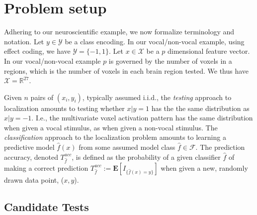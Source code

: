 \documentclass[12pt,a4paper]{article}
\newcommand{\set}[1]{\{ #1 \}} %
\newcommand{\indicator}[1]{I_{\set{#1}}} %
\newcommand{\reals}{\mathbb{R}} %
\newcommand{\features}{x} %
\newcommand{\outcomes}{y} %
\newcommand{\featureS}{\mathcal{X}} %
\newcommand{\outcomeS}{\mathcal{Y}} %
\newcommand{\hyp}{f} %
\newcommand{\hypEstim}{\hat{\hyp}} %
\newcommand{\hypclass}{\mathcal{F}}
\newcommand{\expect}[1]{\mathbf{E}\left[ #1 \right]} %
\newcommand{\acc}{T^{acc}}
\begin{document}
\section{Problem setup}
\label{sec:problem_setup}

Adhering to our neuroscientific example, we now formalize terminology and notation. 
Let $\outcomes \in \outcomeS$ be a class encoding. In our vocal/non-vocal example, using effect coding, we have $\outcomeS=\set{-1,1}$.
Let $\features \in \featureS$ be a $p$ dimensional feature vector. 
In our vocal/non-vocal example $p$ is governed by the number of voxels in a regions, which is the number of voxels in each brain region tested. We thus have $\featureS=\reals^{27}$. 

Given $n$ pairs of $(\features_i,\outcomes_i)$, typically assumed i.i.d., the \emph{testing} approach to localization amounts to testing whether $\features|\outcomes=1$ has the the same distribution as $\features|\outcomes=-1$.
I.e., the multivariate voxel activation pattern has the same distribution when given a vocal stimulus, as when given a non-vocal stimulus. 
The \emph{classification} approach to the localization problem amounts to learning a predictive model $\hypEstim(\features)$ from some assumed model class $\hypEstim \in \hypclass$. 
The prediction accuracy, denoted $\acc_{\hypEstim}$, is defined as the probability of a given classifier $\hypEstim$ of making a correct prediction $\acc_{\hypEstim}:=\expect{\indicator{\hypEstim(x)=y}}$ when given a new, randomly drawn data point, ($\features,\outcomes$).



\subsection{Candidate Tests}
\label{sec:considerations}
\end{document}
